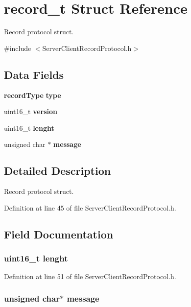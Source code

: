 \section{record\+\_\+t Struct Reference}
\label{structrecord__t}


Record protocol struct.  




{\ttfamily \#include $<$Server\+Client\+Record\+Protocol.\+h$>$}

\subsection*{Data Fields}
\begin{DoxyCompactItemize}
\item 
{\bf record\+Type} {\bf type}
\item 
uint16\+\_\+t {\bf version}
\item 
uint16\+\_\+t {\bf lenght}
\item 
unsigned char $\ast$ {\bf message}
\end{DoxyCompactItemize}


\subsection{Detailed Description}
Record protocol struct. 

Definition at line 45 of file Server\+Client\+Record\+Protocol.\+h.



\subsection{Field Documentation}
\subsubsection[{lenght}]{\setlength{\rightskip}{0pt plus 5cm}uint16\+\_\+t lenght}\label{structrecord__t_a9780a19b886e6b96fa57c2cdd0f2aa51}


Definition at line 51 of file Server\+Client\+Record\+Protocol.\+h.

\subsubsection[{message}]{\setlength{\rightskip}{0pt plus 5cm}unsigned char$\ast$ message}\label{structrecord__t_abb13456032cf48eaa794391b6ed937c7}


